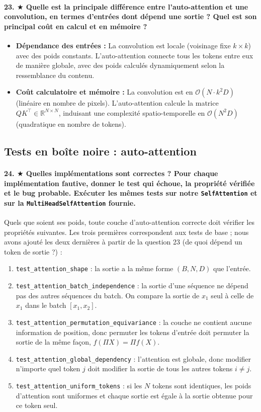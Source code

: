 \documentclass{report}
\begin{document}
\paragraph{23. $\bigstar$ Quelle est la principale différence entre l'auto-attention et une convolution, en termes d'entrées dont dépend une sortie ? Quel est son principal coût en calcul et en mémoire ?}
\begin{itemize}
    \item \textbf{Dépendance des entrées :} La convolution est locale (voisinage fixe $k \times k$) avec des poids constants. L'auto-attention connecte tous les tokens entre eux de manière globale, avec des poids calculés dynamiquement selon la ressemblance du contenu.
    \item \textbf{Coût calculatoire et mémoire :} La convolution est en $\mathcal{O}(N \cdot k^2 D)$ (linéaire en nombre de pixels). L'auto-attention calcule la matrice $Q K^\top \in \mathbb{R}^{N \times N}$, induisant une complexité spatio-temporelle en $\mathcal{O}(N^2 D)$ (quadratique en nombre de tokens).
\end{itemize}

\subsection{Tests en boîte noire : auto-attention}
\paragraph{24. $\bigstar$ Quelles implémentations sont correctes ? Pour chaque implémentation fautive, donner le test qui échoue, la propriété vérifiée et le bug probable. Exécuter les mêmes tests sur notre \texttt{SelfAttention} et sur la \texttt{MultiHeadSelfAttention} fournie.}
Quels que soient ses poids, toute couche d'auto-attention correcte doit vérifier les propriétés suivantes. Les trois premières correspondent aux tests de base ; nous avons ajouté les deux dernières à partir de la question 23 (de quoi dépend un token de sortie ?) :
\begin{enumerate}
    \item \texttt{test\_attention\_shape} : la sortie a la même forme $(B, N, D)$ que l'entrée.
    \item \texttt{test\_attention\_batch\_independence} : la sortie d'une séquence ne dépend pas des autres séquences du batch. On compare la sortie de $x_1$ seul à celle de $x_1$ dans le batch $[x_1, x_2]$.
    \item \texttt{test\_attention\_permutation\_equivariance} : la couche ne contient aucune information de position, donc permuter les tokens d'entrée doit permuter la sortie de la même façon, $f(\Pi X) = \Pi f(X)$.
    \item \texttt{test\_attention\_global\_dependency} : l'attention est globale, donc modifier n'importe quel token $j$ doit modifier la sortie de tous les autres tokens $i \neq j$.
    \item \texttt{test\_attention\_uniform\_tokens} : si les $N$ tokens sont identiques, les poids d'attention sont uniformes et chaque sortie est égale à la sortie obtenue pour ce token seul.
\end{enumerate}
\end{document}
